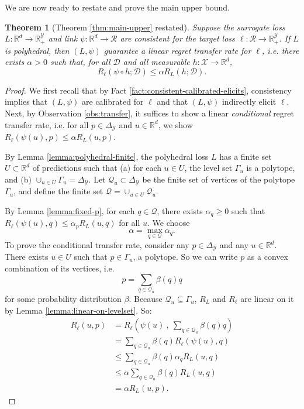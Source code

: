 \documentclass{article}
\newtheorem{theorem}{Theorem}
\newcommand{\reals}{\mathbb{R}}
\newcommand{\simplex}{\Delta_\Y}
\newcommand{\D}{\mathcal{D}}
\newcommand{\R}{\mathcal{R}}
\newcommand{\X}{\mathcal{X}}
\newcommand{\Y}{\mathcal{Y}}
\begin{document}
We are now ready to restate and prove the main upper bound.
\begin{theorem}[Theorem \ref{thm:main-upper} restated]
  Suppose the surrogate loss $L: \reals^d \to \reals_+^{\Y}$ and link $\psi: \reals^d \to \R$ are consistent for the target loss $\ell: \R \to \reals_+^{\Y}$.
  If $L$ is polyhedral, then $(L,\psi)$ guarantee a linear regret transfer rate for $\ell$, i.e. there exists $\alpha > 0$ such that, for all $\D$ and all measurable $h: \X \to \reals^d$,
    \[ R_{\ell}(\psi \circ h ; \D) \leq \alpha R_L(h ; \D) . \]
\end{theorem}
\begin{proof}
  We first recall that by Fact \ref{fact:consistent-calibrated-elicits}, consistency implies that $(L,\psi)$ are calibrated for $\ell$ and that $(L,\psi)$ indirectly elicit $\ell$.
  Next, by Observation \ref{obs:transfer}, it suffices to show a linear \emph{conditional} regret transfer rate, i.e. for all $p \in \simplex$ and $u \in \reals^d$, we show $R_{\ell}(\psi(u),p) \leq \alpha R_L(u,p)$.
  
  By Lemma \ref{lemma:polyhedral-finite}, the polyhedral loss $L$ has a finite set $U \subset \reals^d$ of predictions such that (a) for each $u \in U$, the level set $\Gamma_u$ is a polytope, and (b) $\cup_{u \in U} \Gamma_u = \simplex$.
  Let $\mathcal{Q}_u \subset \simplex$ be the finite set of vertices of the polytope $\Gamma_u$, and define the finite set $\mathcal{Q} = \cup_{u \in U} \mathcal{Q}_u$.
  
  By Lemma \ref{lemma:fixed-p}, for each $q \in \mathcal{Q}$, there exists $\alpha_q \geq 0$ such that $R_{\ell}(\psi(u),q) \leq \alpha_p R_L(u,q)$ for all $u$.
  We choose
    \[ \alpha = \max_{q \in \mathcal{Q}} \alpha_q . \]
  To prove the conditional transfer rate, consider any $p \in \simplex$ and any $u \in \reals^d$.
  There exists $u \in U$ such that $p \in \Gamma_u$, a polytope.
  So we can write $p$ as a convex combination of its vertices, i.e.
    \[ p = \sum_{q \in \mathcal{Q}_u} \beta(q) q \]
  for some probability distribution $\beta$.
  Because $\mathcal{Q}_u \subseteq \Gamma_u$, $R_L$ and $R_{\ell}$ are linear on it by Lemma \ref{lemma:linear-on-levelset}.
  So:
  \begin{align*}
    R_{\ell}(u,p)
    &=    R_{\ell}\left(\psi(u) ~,~ \sum_{q \in \mathcal{Q}_u} \beta(q) q\right)  \\
    &=    \sum_{q \in \mathcal{Q}_u} \beta(q) R_{\ell}(\psi(u),q)  \\
    &\leq \sum_{q \in \mathcal{Q}_u} \beta(q) \alpha_{q} R_L(u,q)  \\
    &\leq \alpha \sum_{q \in \mathcal{Q}_u} \beta(q) R_L(u,q)  \\
    &=    \alpha R_L(u, p) .
  \end{align*}
\end{proof}
\end{document}
